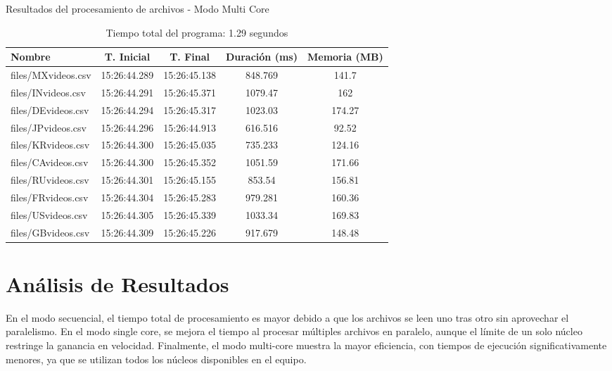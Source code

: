 \documentclass[a4paper,12pt]{report}
\begin{document}
\begin{table}[H]
\centering
\caption{Resultados del procesamiento de archivos - Modo Multi Core}
\begin{tabular}{|l|c|c|c|c|}
\hline
\textbf{Nombre}       & \textbf{T. Inicial} & \textbf{T. Final} & \textbf{Duración (ms)} & \textbf{Memoria (MB)} \\ \hline
files/MXvideos.csv    & 15:26:44.289       & 15:26:45.138     & 848.769                & 141.7                \\ \hline
files/INvideos.csv    & 15:26:44.291       & 15:26:45.371     & 1079.47                & 162                  \\ \hline
files/DEvideos.csv    & 15:26:44.294       & 15:26:45.317     & 1023.03                & 174.27               \\ \hline
files/JPvideos.csv    & 15:26:44.296       & 15:26:44.913     & 616.516                & 92.52                \\ \hline
files/KRvideos.csv    & 15:26:44.300       & 15:26:45.035     & 735.233                & 124.16               \\ \hline
files/CAvideos.csv    & 15:26:44.300       & 15:26:45.352     & 1051.59                & 171.66               \\ \hline
files/RUvideos.csv    & 15:26:44.301       & 15:26:45.155     & 853.54                 & 156.81               \\ \hline
files/FRvideos.csv    & 15:26:44.304       & 15:26:45.283     & 979.281                & 160.36               \\ \hline
files/USvideos.csv    & 15:26:44.305       & 15:26:45.339     & 1033.34                & 169.83               \\ \hline
files/GBvideos.csv    & 15:26:44.309       & 15:26:45.226     & 917.679                & 148.48               \\ \hline
\end{tabular}
\caption*{Tiempo total del programa: 1.29 segundos}
\end{table}

\section{Análisis de Resultados}
En el modo secuencial, el tiempo total de procesamiento es mayor debido a que los archivos se leen uno tras otro sin aprovechar el paralelismo. En el modo single core, se mejora el tiempo al procesar múltiples archivos en paralelo, aunque el límite de un solo núcleo restringe la ganancia en velocidad. Finalmente, el modo multi-core muestra la mayor eficiencia, con tiempos de ejecución significativamente menores, ya que se utilizan todos los núcleos disponibles en el equipo.
\end{document}

